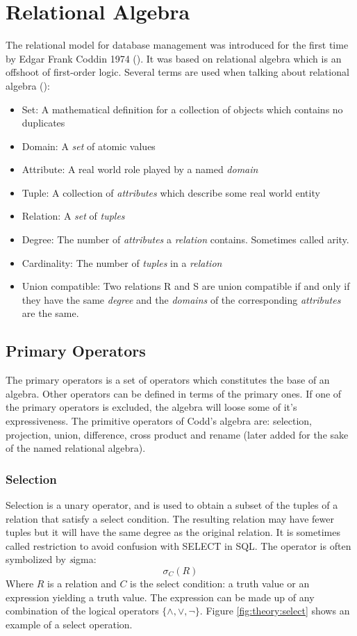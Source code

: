 \section{Relational Algebra}
The relational model for database management was introduced for the first time by Edgar Frank Coddin 1974 (\cite{TDT4225}). It was based on relational algebra which is an offshoot of first-order logic. Several terms are used when talking about relational algebra (\cite{gordonRussel, newYorkDB, sudarshan}):
\begin{itemize}
\item Set: A mathematical definition for a collection of objects which contains no duplicates
\item Domain: A \textit{set} of atomic values
\item Attribute: A real world role played by a named \textit{domain}
\item Tuple: A collection of \textit{attributes} which describe some real world entity
\item Relation: A \textit{set} of \textit{tuples}
\item Degree: The number of \textit{attributes} a \textit{relation} contains. Sometimes called arity.
\item Cardinality: The number of \textit{tuples} in a \textit{relation}
\item Union compatible: Two relations R and S are union compatible if and only if they have the same \textit{degree} and the \textit{domains} of the corresponding \textit{attributes} are the same.
\end{itemize}
\subsection{Primary Operators}
The primary operators is a set of operators which constitutes the base of an algebra. Other operators can be defined in terms of the primary ones. If one of the primary operators is excluded, the algebra will loose some of it's expressiveness. The primitive operators of Codd's algebra are: selection, projection, union, difference, cross product and rename (later added for the sake of the named relational algebra).
\subsubsection{Selection}
Selection is a unary operator, and is used to obtain a subset of the tuples of a relation that satisfy a select condition. The resulting relation may have fewer tuples but it will have the same degree as the original relation. It is sometimes called restriction to avoid confusion with SELECT in SQL. The operator is often symbolized by \emph{s}igma: 
\begin{equation*}
\sigma_{C}(R)
\end{equation*}
Where $R$ is a relation and $C$ is the select condition: a truth value or an
expression yielding a truth value. The expression can be made up of any
combination of the logical operators \begin{math}\{ \wedge, \vee,
\neg\}\end{math}. Figure \ref{fig:theory:select} shows an example of a select
operation.

